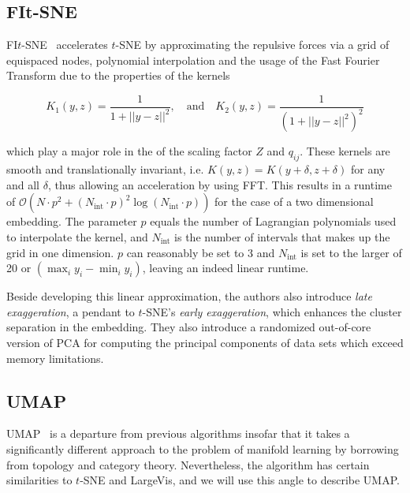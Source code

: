 \subsection{FIt-SNE}

FI$t$-SNE~\cite{fitsne} accelerates $t$-SNE by approximating the repulsive forces via a grid
of equispaced nodes, polynomial interpolation and the usage of the Fast Fourier
Transform due to the properties of the kernels

\begin{equation}
  K_1(y, z) = \frac{1}{1 + || y - z ||^2}, \quad \text{and} \quad K_2(y, z) = \frac{1}{(1 + || y - z ||^2)^2}
\end{equation}

which play a major role in the of the scaling factor $Z$ and $q_{ij}$. These
kernels are smooth and translationally invariant, i.e. $K(y, z) = K(y + \delta,
z + \delta)$ for any and all $\delta$, thus allowing an acceleration by using
FFT. This results in a runtime of $\mathcal{O}(N \cdot p^2 + (N_\text{int} \cdot p)^2
\log (N_\text{int} \cdot p))$ for the case of a two dimensional embedding. The
parameter $p$ equals the number of Lagrangian polynomials used to interpolate
the kernel, and $N_\text{int}$ is the number of intervals that makes up the
grid in one dimension. $p$ can reasonably be set to 3 and $N_\text{int}$ is set to the
larger of 20 or $(\max_i y_i - \min_i y_i)$, leaving an indeed linear runtime.

Beside developing this linear approximation, the authors also introduce \emph{late exaggeration},
a pendant to $t$-SNE's \emph{early exaggeration}, which enhances the cluster separation
in the embedding. They also introduce a randomized out-of-core version of PCA for computing
the principal components of data sets which exceed memory limitations.

\vfill

\subsection{UMAP}

UMAP~\cite{umap} is a departure from previous algorithms insofar that it takes a significantly
different approach to the problem of manifold learning by borrowing from topology and category
theory. Nevertheless, the algorithm has certain similarities to $t$-SNE and LargeVis, and we
will use this angle to describe UMAP.

